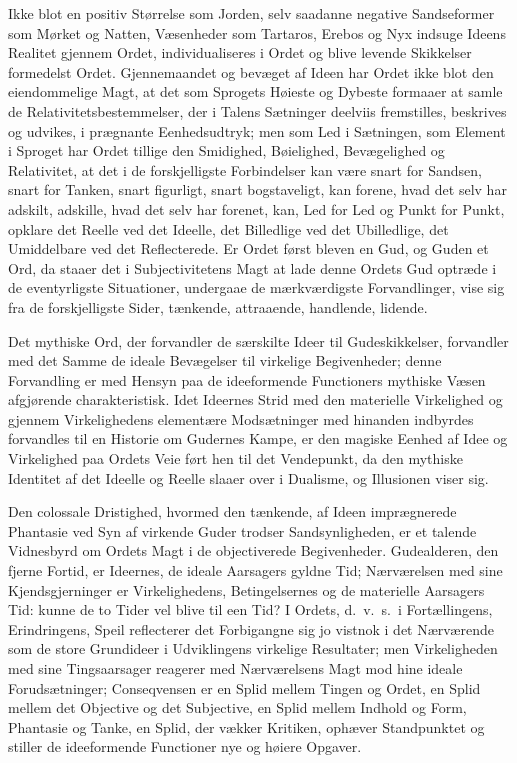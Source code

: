\documentclass[12pt]{book}
\newcommand{\opage}[1]{\marginnote{\footnotesize\textit{[#1]}}}
\begin{document}
Ikke blot en positiv Størrelse som Jorden, selv saadanne
negative Sandseformer som Mørket og Natten, Væsenheder
som Tartaros, Erebos og Nyx indsuge Ideens Realitet
gjennem Ordet, individualiseres i Ordet og blive levende
Skikkelser formedelst Ordet. Gjennemaandet og bevæget
af Ideen har Ordet ikke blot den eiendommelige Magt,
at det som Sprogets Høieste og Dybeste formaaer at samle
de Relativitetsbestemmelser, der i Talens Sætninger deelviis
fremstilles, beskrives og udvikes, i prægnante Eenhedsudtryk; %
men som Led i Sætningen, som Element i Sproget har Ordet
tillige den Smidighed, Bøielighed, Bevægelighed og Relativitet,
at det i de forskjelligste Forbindelser kan være snart for
Sandsen, snart for Tanken, snart figurligt, snart bogstaveligt,
kan forene, hvad det selv har adskilt, adskille, hvad det selv
har forenet, kan, Led for Led og Punkt for Punkt, opklare det
Reelle ved det Ideelle, det Billedlige ved det Ubilledlige, det
Umiddelbare ved det Reflecterede. Er Ordet først bleven en
Gud, og Guden et Ord, da staaer det i Subjectivitetens
Magt at lade denne Ordets Gud optræde i de eventyrligste
Situationer, undergaae de mærkværdigste Forvandlinger, vise
sig fra de forskjelligste Sider, tænkende, attraaende, handlende,
lidende.

Det mythiske Ord, der forvandler de særskilte Ideer til
Gudeskikkelser, forvandler med det Samme de ideale Bevægelser
til virkelige Begivenheder; denne Forvandling er med
Hensyn paa de ideeformende Functioners mythiske Væsen afgjørende
charakteristisk. Idet Ideernes Strid med den materielle
Virkelighed og gjennem Virkelighedens elementære
\opage{80}Modsætninger med hinanden indbyrdes forvandles til en Historie
om Gudernes Kampe, er den magiske Eenhed af Idee
og Virkelighed paa Ordets Veie ført hen til det Vendepunkt,
da den mythiske Identitet af det Ideelle og Reelle slaaer over
i Dualisme, og Illusionen viser sig.

Den colossale Dristighed, hvormed den tænkende, af
Ideen imprægnerede Phantasie ved Syn af virkende Guder
trodser Sandsynligheden, er et talende Vidnesbyrd om Ordets
Magt i de objectiverede Begivenheder. Gudealderen, den
fjerne Fortid, er Ideernes, de ideale Aarsagers gyldne Tid;
Nærværelsen med sine Kjendsgjerninger er Virkelighedens,
Betingelsernes og de materielle Aarsagers Tid: kunne de to
Tider vel blive til een Tid? I Ordets, d.\ v.\ s.\ i Fortællingens,
Erindringens, Speil reflecterer det Forbigangne sig
jo vistnok i det Nærværende som de store Grundideer i Udviklingens
virkelige Resultater; men Virkeligheden med sine
Tingsaarsager reagerer med Nærværelsens Magt mod hine
ideale Forudsætninger; Conseqvensen er en Splid mellem
Tingen og Ordet, en Splid mellem det Objective og det
Subjective, en Splid mellem Indhold og Form, Phantasie
og Tanke, en Splid, der vækker Kritiken, ophæver Standpunktet
og stiller de ideeformende Functioner nye og høiere
Opgaver.
\end{document}
